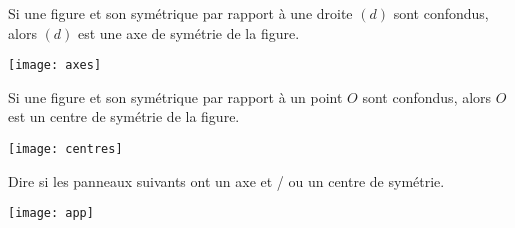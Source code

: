 	\begin{mydef}
		Si une figure et son symétrique par rapport à une droite $(d)$ sont confondus, alors $(d)$ est une axe de symétrie de la figure.
	\end{mydef}

	\begin{myexs}
		\begin{center}
			\texttt{[image: axes]}
		\end{center}
	\end{myexs}

	\begin{mydef}
		Si une figure et son symétrique par rapport à un point $O$ sont confondus, alors $O$ est un centre de symétrie de la figure.
	\end{mydef}

	\begin{myexs}
		\begin{center}
			\texttt{[image: centres]}
		\end{center}
	\end{myexs}


	\begin{myapp}
		Dire si les panneaux suivants ont un axe et / ou un centre de symétrie.
		
		\begin{center}
			\texttt{[image: app]}
		\end{center}
	\end{myapp}